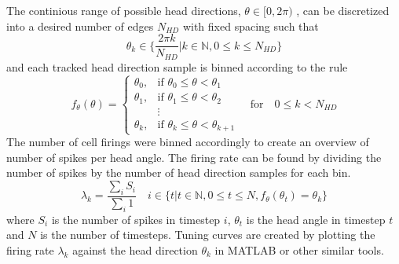 The continious range of possible head directions, 
$\theta \in [0, 2\pi)$
, can be discretized into a desired number of edges $N_{HD}$ with fixed spacing such that
\begin{equation}
\theta_k \in \{\frac{2 \pi k}{N_{HD}}| k \in \mathbb{N}, 0 \leq k \leq N_{HD} \}
\end{equation}
and each tracked head direction sample is binned according to the rule
\begin{equation}
    f_{\theta}(\theta) =  \begin{cases}
        \theta_0, & \text{if } \theta_0 \leq \theta < \theta_{1} \\
        \theta_1, & \text{if } \theta_1 \leq \theta < \theta_{2} \\
         & \vdots \\
        \theta_k, & \text{if } \theta_k \leq \theta < \theta_{k+1}
    \end{cases} \quad \text{for} \quad 0 \leq k < N_{HD}
\end{equation}
The number of cell firings were binned accordingly to create an overview of number of spikes per head angle.
The firing rate can be found by dividing the number of spikes by the number of head direction samples for each bin.
\begin{equation} \label{eq:firing_rate}
    \lambda_k = \frac{\sum_i S_i}{\sum_i 1} \quad i \in \{t | t \in \mathbb{N}, 0 \leq t \leq N, f_\theta(\theta_t) = \theta_k\}
\end{equation}
where $S_i$ is the number of spikes in timestep $i$, $\theta_t$ is the head angle in timestep $t$ and $N$ is the number of timesteps. Tuning curves are created by plotting the firing rate $\lambda_k$ against the head direction $\theta_k$ in MATLAB or other similar tools.

